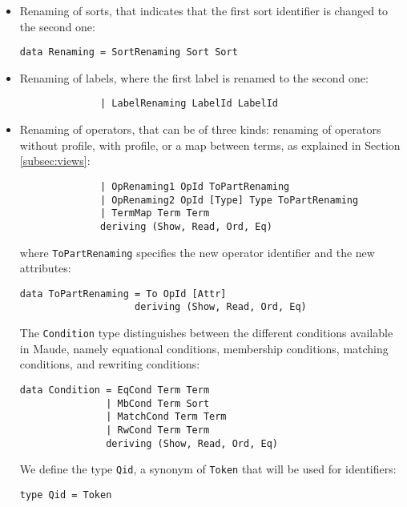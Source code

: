 \begin{itemize}

\item Renaming of sorts, that indicates that the first sort identifier
is changed to the second one:

{\codesize
\begin{verbatim}
data Renaming = SortRenaming Sort Sort
\end{verbatim}
}

\item Renaming of labels, where the first label is renamed to the
second one:

{\codesize
\begin{verbatim}
              | LabelRenaming LabelId LabelId
\end{verbatim}
}

\item Renaming of operators, that can be of three kinds: renaming
of operators without profile, with profile, or a map between terms,
as explained in Section \ref{subsec:views}:

{\codesize
\begin{verbatim}
              | OpRenaming1 OpId ToPartRenaming
              | OpRenaming2 OpId [Type] Type ToPartRenaming
              | TermMap Term Term
              deriving (Show, Read, Ord, Eq)
\end{verbatim}
}

\noindent where \verb"ToPartRenaming" specifies the new operator identifier
and the new attributes:

{\codesize
\begin{verbatim}
data ToPartRenaming = To OpId [Attr]
                    deriving (Show, Read, Ord, Eq)
\end{verbatim}
}

The \verb"Condition" type distinguishes between the different conditions
available in Maude, namely equational conditions, membership conditions,
matching conditions, and rewriting conditions:

{\codesize
\begin{verbatim}
data Condition = EqCond Term Term
               | MbCond Term Sort
               | MatchCond Term Term
               | RwCond Term Term
               deriving (Show, Read, Ord, Eq)
\end{verbatim}
}

We define the type \verb"Qid", a synonym of \verb"Token" that
will be used for identifiers:

{\codesize
\begin{verbatim}
type Qid = Token
\end{verbatim}
}


\end{itemize}
